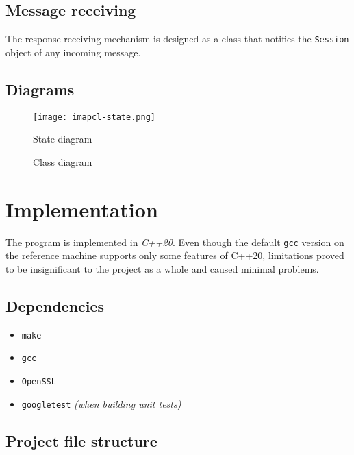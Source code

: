 \documentclass[a4]{report}
\begin{document}
\section{Message receiving}

The response receiving mechanism is designed as a class that notifies the \texttt{Session} object of any incoming message.

\section{Diagrams}

\begin{figure}
  \centering
  \texttt{[image: imapcl-state.png]}
  \caption{State diagram}
  \label{state}
\end{figure}

\begin{figure}[t]
  \centering
  \caption{Class diagram}
  \label{class}
\end{figure}


\chapter{Implementation}

The program is implemented in \textit{C++20}. Even though the default \texttt{gcc} version on the reference machine supports only some features of C++20, limitations proved to be insignificant to the project as a whole and caused minimal problems.

\section{Dependencies}

\begin{itemize}
\item \texttt{make}
\item \texttt{gcc}
\item \texttt{OpenSSL}
\item \texttt{googletest} \textit{(when building unit tests)}
\end{itemize}


\section{Project file structure}
\end{document}
